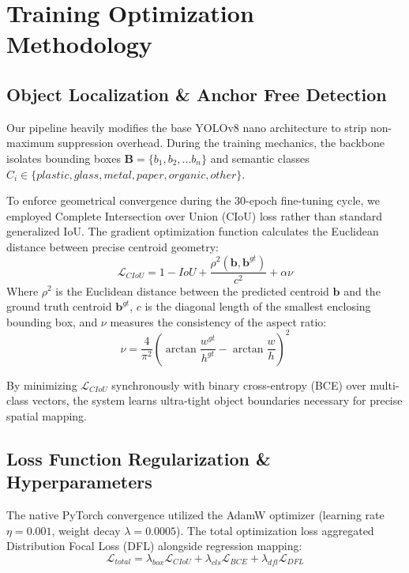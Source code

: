 \documentclass[10pt,twocolumn,letterpaper]{article}
\begin{document}
\section{Training Optimization Methodology}

\subsection{Object Localization \& Anchor Free Detection}
Our pipeline heavily modifies the base YOLOv8 nano architecture to strip non-maximum suppression overhead. During the training mechanics, the backbone isolates bounding boxes $\mathbf{B} = \{b_1, b_2, ... b_n\}$ and semantic classes $C_i \in \{plastic, glass, metal, paper, organic, other\}$. 

To enforce geometrical convergence during the 30-epoch fine-tuning cycle, we employed Complete Intersection over Union (CIoU) loss rather than standard generalized IoU. The gradient optimization function calculates the Euclidean distance between precise centroid geometry:
\begin{equation}
\mathcal{L}_{CIoU} = 1 - IoU + \frac{\rho^2(\mathbf{b}, \mathbf{b}^{gt})}{c^2} + \alpha \nu
\end{equation}
Where $\rho^2$ is the Euclidean distance between the predicted centroid $\mathbf{b}$ and the ground truth centroid $\mathbf{b}^{gt}$, $c$ is the diagonal length of the smallest enclosing bounding box, and $\nu$ measures the consistency of the aspect ratio:
\begin{equation}
\nu = \frac{4}{\pi^2} \left( \arctan\frac{w^{gt}}{h^{gt}} - \arctan\frac{w}{h} \right)^2
\end{equation}

By minimizing $\mathcal{L}_{CIoU}$ synchronously with binary cross-entropy (BCE) over multi-class vectors, the system learns ultra-tight object boundaries necessary for precise spatial mapping.

\subsection{Loss Function Regularization \& Hyperparameters}
The native PyTorch convergence utilized the AdamW optimizer (learning rate $\eta = 0.001$, weight decay $\lambda = 0.0005$). The total optimization loss aggregated Distribution Focal Loss (DFL) alongside regression mapping:
\begin{equation}
\mathcal{L}_{total} = \lambda_{box}\mathcal{L}_{CIoU} + \lambda_{cls}\mathcal{L}_{BCE} + \lambda_{dfl}\mathcal{L}_{DFL}
\end{equation}
\end{document}
